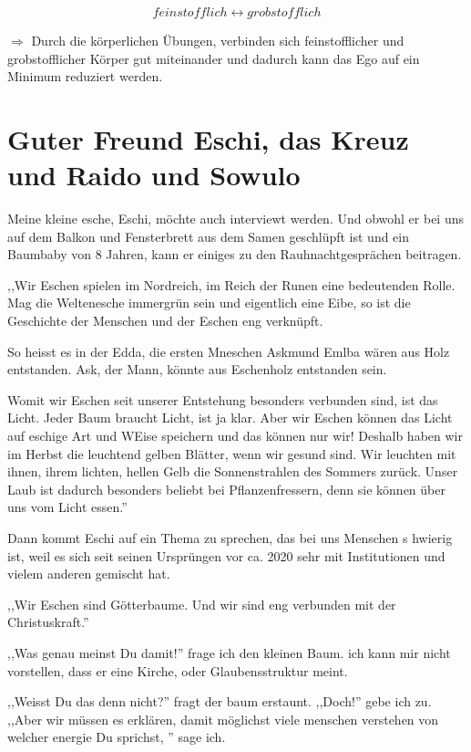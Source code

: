 \documentclass[11pt,titlepage,a5paper]{book}
\begin{document}
$$ feinstofflich \leftrightarrow grobstofflich $$

$\Rightarrow $ Durch die körperlichen Übungen, verbinden sich feinstofflicher und grobstofflicher Körper gut miteinander und dadurch kann das Ego auf ein Minimum reduziert werden.

\section*{Guter Freund Eschi, das Kreuz und Raido  und Sowulo }

Meine kleine esche, Eschi, möchte auch interviewt werden. Und obwohl er bei uns auf dem Balkon und Fensterbrett aus dem Samen geschlüpft ist und ein Baumbaby von 8 Jahren, kann er einiges zu den Rauhnachtgesprächen beitragen. 

,,Wir Eschen spielen im Nordreich, im Reich der Runen eine bedeutenden Rolle. Mag die Weltenesche immergrün sein und eigentlich eine Eibe, so ist die Geschichte der Menschen und der Eschen eng verknüpft.

So heisst es in der Edda, die ersten Mneschen Askmund Emlba wären aus Holz entstanden. Ask, der Mann, könnte aus Eschenholz entstanden sein.

Womit wir Eschen seit unserer Entstehung besonders verbunden sind, ist das Licht. Jeder Baum braucht Licht, ist ja klar. Aber wir Eschen können das Licht auf eschige Art und WEise speichern und das können nur wir! Deshalb haben wir im Herbst die leuchtend gelben Blätter, wenn wir gesund sind. Wir leuchten mit ihnen, ihrem lichten, hellen Gelb die Sonnenstrahlen des Sommers zurück. Unser Laub ist dadurch besonders beliebt bei Pflanzenfressern, denn sie können über uns vom Licht essen.''

Dann kommt Eschi auf ein Thema zu sprechen, das bei uns Menschen s hwierig ist, weil es sich seit seinen Ursprüngen vor ca. 2020 sehr mit Institutionen und vielem anderen gemischt hat.

,,Wir Eschen sind Götterbaume. Und wir sind eng verbunden mit der Christuskraft.''

,,Was genau meinst Du damit!'' frage ich den kleinen Baum. ich kann mir nicht vorstellen, dass er eine Kirche, oder Glaubensstruktur meint.

,,Weisst Du das denn nicht?'' fragt der baum erstaunt. ,,Doch!'' gebe ich zu. ,,Aber wir müssen es erklären, damit möglichst viele menschen verstehen von welcher energie Du sprichst, '' sage ich.
\end{document}
